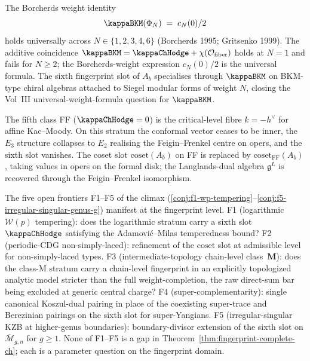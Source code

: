 \begin{remark}
\label{rem:fingerprint-bkm-universal}
The Borcherds weight identity
\[
 \kappaBKM(\Phi_{N}) \;=\; c_{N}(0)/2
\]
holds universally across $N \in \{1, 2, 3, 4, 6\}$ (Borcherds 1995;
Gritsenko 1999). The additive coincidence $\kappaBKM = \kappaChHodge
+ \chi(\mathcal{O}_{\mathrm{fiber}})$ holds at $N = 1$ and fails for
$N \ge 2$; the Borcherds-weight expression $c_N(0)/2$ is the universal
formula. The sixth fingerprint slot of $A_b$ specialises through
$\kappaBKM$ on BKM-type chiral algebras attached to Siegel modular
forms of weight $N$, closing the Vol~III universal-weight-formula
question for $\kappaBKM$.
\end{remark}

\begin{remark}
\label{rem:fingerprint-FF-critical}
The fifth class FF ($\kappaChHodge = 0$) is the critical-level fibre
$k = -h^{\vee}$ for affine Kac--Moody. On this stratum the conformal
vector ceases to be inner, the $E_{3}$ structure collapses to $E_{2}$
realising the Feigin--Frenkel centre on opers, and the sixth slot
vanishes. The coset slot $\mathrm{coset}(A_b)$ on FF is replaced by
$\mathrm{coset}_{\mathrm{FF}}(A_b)$, taking values in opers on the
formal disk; the Langlands-dual algebra $\mathfrak{g}^{L}$ is recovered
through the Feigin--Frenkel isomorphism.
\end{remark}

\begin{remark}
\label{rem:fingerprint-five-frontiers}
The five open frontiers F1--F5 of the climax
(\cref{conj:f1-wp-tempering}--\cref{conj:f5-irregular-singular-genus-g})
manifest at the fingerprint level. F1 (logarithmic $\mathcal{W}(p)$
tempering): does the logarithmic stratum carry a sixth slot
$\kappaChHodge$ satisfying the Adamovi\'c--Milas temperedness bound?
F2 (periodic-CDG non-simply-laced): refinement of the $\mathrm{coset}$
slot at admissible level for non-simply-laced types. F3
(intermediate-topology chain-level class~$\mathbf{M}$): does the class-M
stratum carry a chain-level fingerprint in an explicitly topologized
analytic model stricter than the full weight-completion, the raw
direct-sum bar being excluded at generic central charge? F4
(super-complementarity): single canonical Koszul-dual pairing in place
of the coexisting super-trace and Berezinian pairings on the sixth
slot for super-Yangians. F5 (irregular-singular KZB at higher-genus
boundaries): boundary-divisor extension of the sixth slot on
$\overline{\mathcal{M}}_{g, n}$ for $g \ge 1$. None of F1--F5 is a gap
in Theorem~\ref{thm:fingerprint-complete-ch}; each is a parameter
question on the fingerprint domain.
\end{remark}
